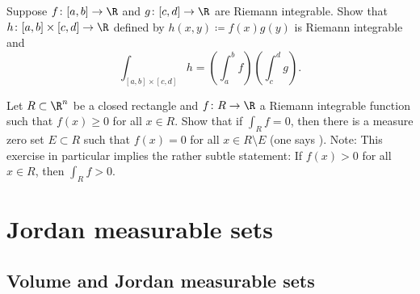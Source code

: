 \begin{exercise}
Suppose $f \colon [a,b] \to \R$ and $g \colon [c,d] \to \R$ are Riemann integrable.
Show that $h \colon [a,b] \times [c,d] \to \R$ defined by $h(x,y) \coloneqq
f(x) g(y)$ is Riemann integrable and
\begin{equation*}
\int_{[a,b] \times [c,d]} h =
\left( \int_a^b f \right)
\left( \int_c^d g \right) .
\end{equation*}
\end{exercise}

\begin{exercise}
Let $R \subset \R^n$ be a closed rectangle and $f \colon R \to \R$ a
Riemann integrable function such that $f(x) \geq 0$ for all $x \in R$.
Show that if $\int_R f = 0$, then there is a measure zero set $E \subset R$ such that
$f(x) = 0$ for all $x \in R \setminus E$
(one says ).
Note: This exercise in particular implies the rather subtle statement: If $f(x) > 0$
for all $x \in R$, then $\int_R f > 0$.
\end{exercise}



\sectionnewpage
\section{Jordan measurable sets}
\label{sec:jordansets}



\subsection{Volume and Jordan measurable sets}

